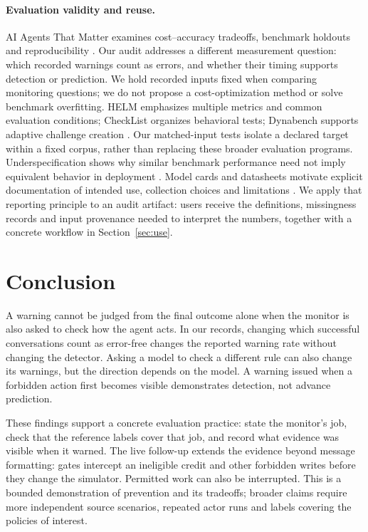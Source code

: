 \documentclass[10pt]{article}
\begin{document}
\paragraph{Evaluation validity and reuse.}
AI Agents That Matter examines cost--accuracy tradeoffs, benchmark holdouts and reproducibility \citep{kapoor2025agents}. Our audit addresses a different measurement question: which recorded warnings count as errors, and whether their timing supports detection or prediction. We hold recorded inputs fixed when comparing monitoring questions; we do not propose a cost-optimization method or solve benchmark overfitting. HELM emphasizes multiple metrics and common evaluation conditions; CheckList organizes behavioral tests; Dynabench supports adaptive challenge creation \citep{liang2022helm,ribeiro2020checklist,kiela2021dynabench}. Our matched-input tests isolate a declared target within a fixed corpus, rather than replacing these broader evaluation programs. Underspecification shows why similar benchmark performance need not imply equivalent behavior in deployment \citep{damour2022underspecification}. Model cards and datasheets motivate explicit documentation of intended use, collection choices and limitations \citep{mitchell2019modelcards,gebru2021datasheets}. We apply that reporting principle to an audit artifact: users receive the definitions, missingness records and input provenance needed to interpret the numbers, together with a concrete workflow in Section~\ref{sec:use}.

\section{Conclusion}
A warning cannot be judged from the final outcome alone when the monitor is also asked to check how the agent acts. In our records, changing which successful conversations count as error-free changes the reported warning rate without changing the detector. Asking a model to check a different rule can also change its warnings, but the direction depends on the model. A warning issued when a forbidden action first becomes visible demonstrates detection, not advance prediction.

These findings support a concrete evaluation practice: state the monitor's job, check that the reference labels cover that job, and record what evidence was visible when it warned. The live follow-up extends the evidence beyond message formatting: gates intercept an ineligible credit and other forbidden writes before they change the simulator. Permitted work can also be interrupted. This is a bounded demonstration of prevention and its tradeoffs; broader claims require more independent source scenarios, repeated actor runs and labels covering the policies of interest.
\end{document}
